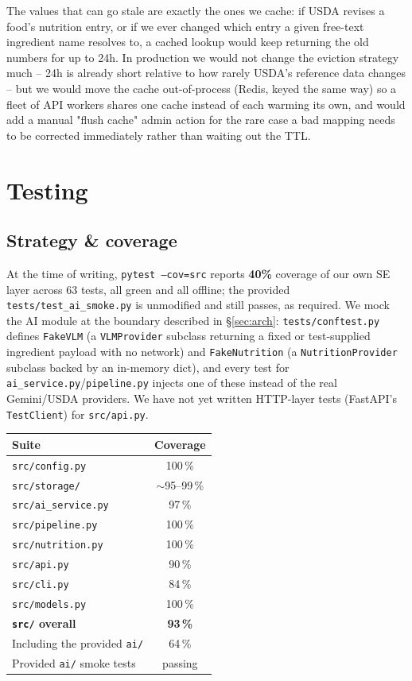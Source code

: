 \documentclass[11pt,a4paper]{article}
\begin{document}
The values that can go stale are exactly the ones we cache: if USDA revises a food's nutrition entry, or if we ever changed which entry a given free-text ingredient name resolves to, a cached lookup would keep returning the old numbers for up to 24h. In production we would not change the eviction strategy much -- 24h is already short relative to how rarely USDA's reference data changes -- but we would move the cache out-of-process (Redis, keyed the same way) so a fleet of API workers shares one cache instead of each warming its own, and would add a manual "flush cache" admin action for the rare case a bad mapping needs to be corrected immediately rather than waiting out the TTL.

\section{Testing}\label{sec:testing}

\subsection{Strategy \& coverage}

At the time of writing, \texttt{pytest --cov=src} reports \textbf{40\%} coverage of our own SE layer across 63 tests, all green and all offline; the provided \texttt{tests/test\_ai\_smoke.py} is unmodified and still passes, as required. We mock the AI module at the boundary described in \S\ref{sec:arch}: \texttt{tests/conftest.py} defines \texttt{FakeVLM} (a \texttt{VLMProvider} subclass returning a fixed or test-supplied ingredient payload with no network) and \texttt{FakeNutrition} (a \texttt{NutritionProvider} subclass backed by an in-memory dict), and every test for \texttt{ai\_service.py}/\texttt{pipeline.py} injects one of these instead of the real Gemini/USDA providers. We have not yet written HTTP-layer tests (FastAPI's \texttt{TestClient}) for \texttt{src/api.py}.

\begin{center}\small
\begin{tabular}{lc}
\toprule
\textbf{Suite} & \textbf{Coverage} \\
\midrule
\texttt{src/config.py} & 100\,\% \\
\texttt{src/storage/} & $\sim$95--99\,\% \\
\texttt{src/ai\_service.py} & 97\,\% \\
\texttt{src/pipeline.py} & 100\,\% \\
\texttt{src/nutrition.py} & 100\,\% \\
\texttt{src/api.py} & 90\,\% \\
\texttt{src/cli.py} & 84\,\% \\
\texttt{src/models.py} & 100\,\% \\
\textbf{\texttt{src/} overall} & \textbf{93\,\%} \\
Including the provided \texttt{ai/} & 64\,\% \\
Provided \texttt{ai/} smoke tests & passing \\
\bottomrule
\end{tabular}
\end{center}
\end{document}
